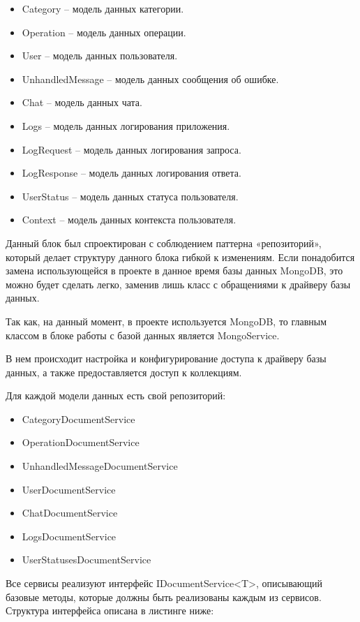 \begin{itemize}
	\item Category – модель данных категории.
	\item Operation – модель данных операции.
	\item User – модель данных пользователя.
	\item UnhandledMessage – модель данных сообщения об ошибке.
	\item Chat – модель данных чата.
	\item Logs – модель данных логирования приложения.
	\item LogRequest – модель данных логирования запроса.
	\item LogResponse – модель данных логирования ответа.
	\item UserStatus – модель данных статуса пользователя.
	\item Context – модель данных контекста пользователя.
\end{itemize}

Данный блок был спроектирован с соблюдением паттерна «репозиторий», который делает структуру данного блока гибкой к изменениям. Если понадобится замена использующейся в проекте в данное время базы данных MongoDB, это можно будет сделать легко, заменив лишь класс с обращениями к драйверу базы данных.

Так как, на данный момент, в проекте используется MongoDB, то главным классом в блоке работы с базой данных является MongoService.

В нем происходит настройка и конфигурирование доступа к драйверу базы данных, а также предоставляется доступ к коллекциям.

Для каждой модели данных есть свой репозиторий:

\begin{itemize}
	\item CategoryDocumentService
	\item OperationDocumentService
	\item UnhandledMessageDocumentService
	\item UserDocumentService
	\item ChatDocumentService
	\item LogsDocumentService
	\item UserStatusesDocumentService
\end{itemize}

Все сервисы реализуют интерфейс IDocumentService<T>, описывающий базовые методы, которые должны быть реализованы каждым из сервисов. Структура интерфейса описана в листинге ниже:

